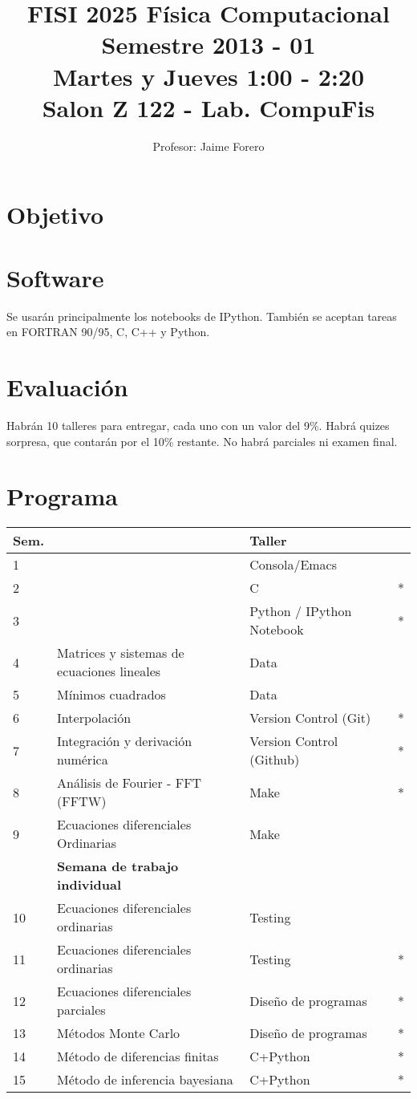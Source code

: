\documentclass[12pt]{article}
\title{FISI 2025 F\'isica Computacional \\
Semestre 2013 - 01\\
Martes y Jueves 1:00 - 2:20 \\
Salon Z 122 - Lab. CompuFis
}
\author{Profesor: Jaime Forero}
\begin{document}
\maketitle
\section*{Objetivo}


\section*{Software}
\noindent Se usar\'an principalmente los notebooks de IPython. Tambi\'en se aceptan tareas en FORTRAN 90/95, C, C++ y Python.

\section*{Evaluaci\'on}
Habr\'an 10 talleres para entregar, cada uno con un valor del 9\%. Habr\'a  quizes sorpresa, que contar\'an por el 10\% restante. No habr\'a parciales ni examen final.

 
\section*{Programa}

\begin{center}
\begin{tabular}{|l|l|l|c|}
\hline
Sem. & & Taller &\\\hline
1 & 	&Consola/Emacs &\\
2 & 	&C  &*\\
3 & 	&Python / IPython Notebook &*\\
4 & Matrices y sistemas de ecuaciones lineales & Data &\\
5 & M\'inimos cuadrados & Data &\\
6 & Interpolaci\'on & Version Control (Git) &*\\
7 & Integraci\'on y derivaci\'on num\'erica & Version Control (Github)& *\\
8 & An\'alisis de Fourier - FFT  (FFTW)& Make& *\\
9 & Ecuaciones diferenciales Ordinarias & Make&\\
 & {\bf Semana de trabajo individual} & &\\
10 & Ecuaciones diferenciales ordinarias & Testing&\\
11 & Ecuaciones diferenciales ordinarias & Testing &*\\
12 & Ecuaciones diferenciales parciales & Dise\~no de programas&*\\
13 & M\'etodos Monte Carlo & Dise\~no de programas &*\\
14 & M\'etodo de diferencias finitas & C+Python &*\\
15 & M\'etodo de inferencia bayesiana& C+Python &*\\
\hline
\end{tabular}
\end{center}
\end{document}
